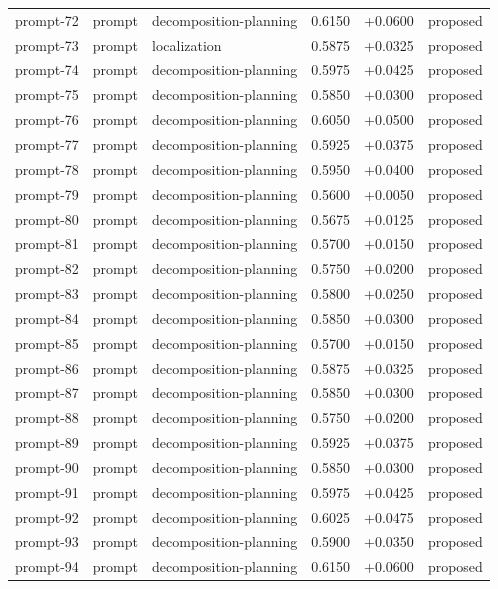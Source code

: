 \begin{center}
\begin{longtable}{llp{5.2cm}rrl}
prompt-72 & prompt & decomposition-planning & 0.6150 & +0.0600 & proposed \\
prompt-73 & prompt & localization & 0.5875 & +0.0325 & proposed \\
prompt-74 & prompt & decomposition-planning & 0.5975 & +0.0425 & proposed \\
prompt-75 & prompt & decomposition-planning & 0.5850 & +0.0300 & proposed \\
prompt-76 & prompt & decomposition-planning & 0.6050 & +0.0500 & proposed \\
prompt-77 & prompt & decomposition-planning & 0.5925 & +0.0375 & proposed \\
prompt-78 & prompt & decomposition-planning & 0.5950 & +0.0400 & proposed \\
prompt-79 & prompt & decomposition-planning & 0.5600 & +0.0050 & proposed \\
prompt-80 & prompt & decomposition-planning & 0.5675 & +0.0125 & proposed \\
prompt-81 & prompt & decomposition-planning & 0.5700 & +0.0150 & proposed \\
prompt-82 & prompt & decomposition-planning & 0.5750 & +0.0200 & proposed \\
prompt-83 & prompt & decomposition-planning & 0.5800 & +0.0250 & proposed \\
prompt-84 & prompt & decomposition-planning & 0.5850 & +0.0300 & proposed \\
prompt-85 & prompt & decomposition-planning & 0.5700 & +0.0150 & proposed \\
prompt-86 & prompt & decomposition-planning & 0.5875 & +0.0325 & proposed \\
prompt-87 & prompt & decomposition-planning & 0.5850 & +0.0300 & proposed \\
prompt-88 & prompt & decomposition-planning & 0.5750 & +0.0200 & proposed \\
prompt-89 & prompt & decomposition-planning & 0.5925 & +0.0375 & proposed \\
prompt-90 & prompt & decomposition-planning & 0.5850 & +0.0300 & proposed \\
prompt-91 & prompt & decomposition-planning & 0.5975 & +0.0425 & proposed \\
prompt-92 & prompt & decomposition-planning & 0.6025 & +0.0475 & proposed \\
prompt-93 & prompt & decomposition-planning & 0.5900 & +0.0350 & proposed \\
prompt-94 & prompt & decomposition-planning & 0.6150 & +0.0600 & proposed \\

\end{longtable}
\end{center}
